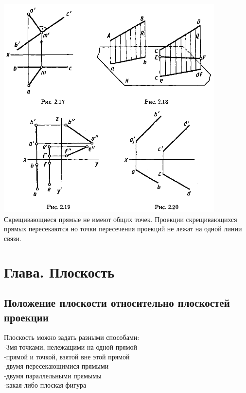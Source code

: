 \documentclass[a4paper, 12pt]{article}
\begin{document}
\includegraphics{img/243.png}\\
Скрещивающиеся прямые не имеют общих точек. Проекции скрещивающихся прямых пересекаются но точки пересечения проекций не лежат на одной линии связи.\\

\section{Глава. Плоскость}
\subsection{Положение плоскости относительно плоскостей проекции}

Плоскость можно задать разными способами:\\
-3мя точками, нележащими на одной прямой\\
-прямой и точкой, взятой вне этой прямой\\
-двумя пересекающимися прямыми\\
-двумя параллельными прямымы\\
-какая-либо плоская фигура\\
\end{document}
